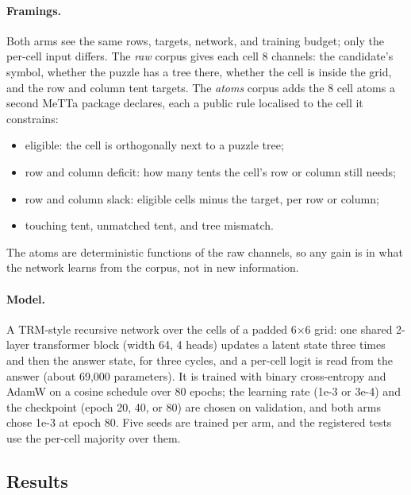 \documentclass[11pt]{article}
\begin{document}
\paragraph{Framings.} Both arms see the same rows, targets, network, and training budget; only the per-cell input differs. The \emph{raw} corpus gives each cell 8 channels: the candidate's symbol, whether the puzzle has a tree there, whether the cell is inside the grid, and the row and column tent targets. The \emph{atoms} corpus adds the 8 cell atoms a second MeTTa package declares, each a public rule localised to the cell it constrains:
\begin{itemize}[leftmargin=*]
  \item eligible: the cell is orthogonally next to a puzzle tree;
  \item row and column deficit: how many tents the cell's row or column still needs;
  \item row and column slack: eligible cells minus the target, per row or column;
  \item touching tent, unmatched tent, and tree mismatch.
\end{itemize}
The atoms are deterministic functions of the raw channels, so any gain is in what the network learns from the corpus, not in new information.

\paragraph{Model.} A TRM-style recursive network over the cells of a padded 6$\times$6 grid: one shared 2-layer transformer block (width 64, 4 heads) updates a latent state three times and then the answer state, for three cycles, and a per-cell logit is read from the answer (about 69{,}000 parameters). It is trained with binary cross-entropy and AdamW on a cosine schedule over 80 epochs; the learning rate (1e-3 or 3e-4) and the checkpoint (epoch 20, 40, or 80) are chosen on validation, and both arms chose 1e-3 at epoch 80. Five seeds are trained per arm, and the registered tests use the per-cell majority over them.

\subsection{Results}

\begin{table}[t]
  \centering
  \small
  
  \caption{Answers solved by the repair TRM and by the skill, of 148 greedy test answers from each proposer (columns). TRM rows are per-cell majorities over five seeds; the last two rows give the range over the five single models.}
  \label{tab:repair}
\end{table}
\end{document}
